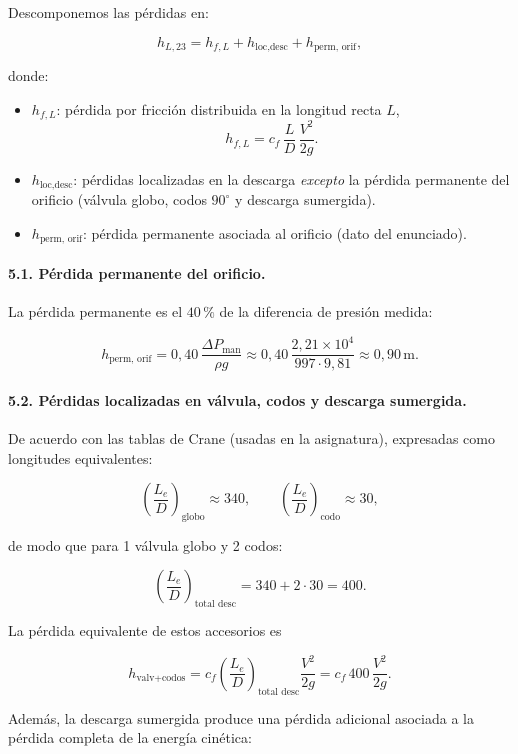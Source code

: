 \documentclass[12pt, a4paper]{article}
\begin{document}
Descomponemos las pérdidas en:

\[
h_{L,23} = h_{f,L} + h_{\text{loc,desc}} + h_{\text{perm, orif}},
\]

donde:

\begin{itemize}
  \item $h_{f,L}$: pérdida por fricción distribuida en la longitud recta $L$,
        \[
        h_{f,L} = c_f\,\frac{L}{D}\,\frac{V^2}{2g}.
        \]
  \item $h_{\text{loc,desc}}$: pérdidas localizadas en la descarga \emph{excepto}
        la pérdida permanente del orificio (válvula globo, codos $90^\circ$ y
        descarga sumergida).
  \item $h_{\text{perm, orif}}$: pérdida permanente asociada al orificio
        (dato del enunciado).
\end{itemize}

\paragraph{5.1. Pérdida permanente del orificio.}

La pérdida permanente es el $40\,\%$ de la diferencia de presión medida:

\[
h_{\text{perm, orif}}
= 0{,}40\,\frac{\Delta P_{\text{man}}}{\rho g}
\approx 0{,}40\,
\frac{2{,}21\times 10^4}{997\cdot 9{,}81}
\approx 0{,}90\,\text{m}.
\]

\paragraph{5.2. Pérdidas localizadas en válvula, codos y descarga sumergida.}

De acuerdo con las tablas de Crane (usadas en la asignatura), expresadas como
longitudes equivalentes:

\[
\left(\frac{L_e}{D}\right)_\text{globo} \approx 340,\qquad
\left(\frac{L_e}{D}\right)_\text{codo} \approx 30,
\]

de modo que para 1 válvula globo y 2 codos:

\[
\left(\frac{L_e}{D}\right)_\text{total desc}
= 340 + 2\cdot 30 = 400.
\]

La pérdida equivalente de estos accesorios es

\[
h_{\text{valv+codos}}
= c_f\left(\frac{L_e}{D}\right)_\text{total desc}\frac{V^2}{2g}
= c_f\,400\,\frac{V^2}{2g}.
\]

Además, la descarga sumergida produce una pérdida adicional asociada a la
pérdida completa de la energía cinética:
\end{document}
